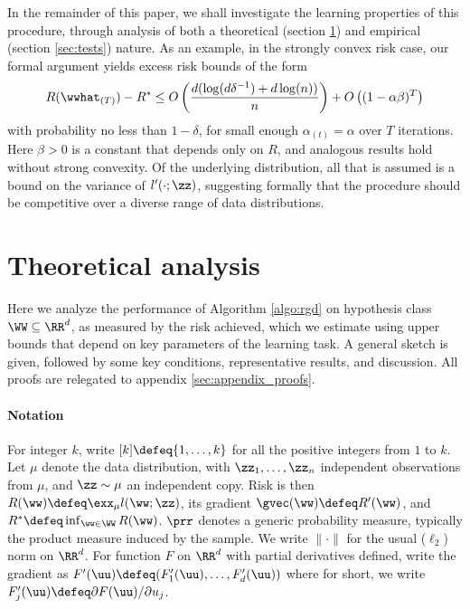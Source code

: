 \documentclass[11pt,oneside]{article}
\theoremstyle{definition} \newtheorem{defn}{Definition}       %
\theoremstyle{plain} \newtheorem{prop}[defn]{Proposition}           %
\theoremstyle{plain} \newtheorem{thm}[defn]{Theorem}                %
\theoremstyle{plain} \newtheorem{lem}[defn]{Lemma}                  %
\theoremstyle{plain} \newtheorem{cor}[defn]{Corollary}              %
\theoremstyle{remark} \newtheorem{rmk}[defn]{Remark}                %
\theoremstyle{remark} \newtheorem{ex}[defn]{Example}                %
\begin{document}
In the remainder of this paper, we shall investigate the learning properties of this procedure, through analysis of both a theoretical (section \ref{sec:algo}) and empirical (section \ref{sec:tests}) nature. As an example, in the strongly convex risk case, our formal argument yields excess risk bounds of the form
%
\begin{align*}
R(\wwhat_{(T)}) - R^{\ast} \leq O\left(\frac{d(\log(d\delta^{-1})+d\log(n))}{n}\right) + O\left((1-\alpha\beta)^{T}\right)
\end{align*}
%
with probability no less than $1-\delta$, for small enough $\alpha_{(t)} = \alpha$ over $T$ iterations. Here $\beta > 0$ is a constant that depends only on $R$, and analogous results hold without strong convexity. Of the underlying distribution, all that is assumed is a bound on the variance of $l^{\prime}(\cdot;\zz)$, suggesting formally that the procedure should be competitive over a diverse range of data distributions.


\section{Theoretical analysis}\label{sec:algo}

Here we analyze the performance of Algorithm \ref{algo:rgd} on hypothesis class $\WW \subseteq \RR^{d}$, as measured by the risk achieved, which we estimate using upper bounds that depend on key parameters of the learning task. A general sketch is given, followed by some key conditions, representative results, and discussion. All proofs are relegated to appendix \ref{sec:appendix_proofs}.


\paragraph{Notation}
For integer $k$, write $[k] \defeq \{1,\ldots,k\}$ for all the positive integers from $1$ to $k$. Let $\mu$ denote the data distribution, with $\zz_{1},\ldots,\zz_{n}$ independent observations from $\mu$, and $\zz \sim \mu$ an independent copy. Risk is then $R(\ww) \defeq \exx_{\mu}l(\ww;\zz)$, its gradient $\gvec(\ww) \defeq R^{\prime}(\ww)$, and $R^{\ast} \defeq \inf_{\ww \in \WW} R(\ww)$. $\prr$ denotes a generic probability measure, typically the product measure induced by the sample. We write $\|\cdot\|$ for the usual ($\ell_{2}$) norm on $\RR^{d}$. For function $F$ on $\RR^{d}$ with partial derivatives defined, write the gradient as $F^{\prime}(\uu) \defeq (F^{\prime}_{1}(\uu),\ldots,F^{\prime}_{d}(\uu))$ where for short, we write $F^{\prime}_{j}(\uu) \defeq \partial F(\uu)/\partial u_{j}$.
\end{document}
